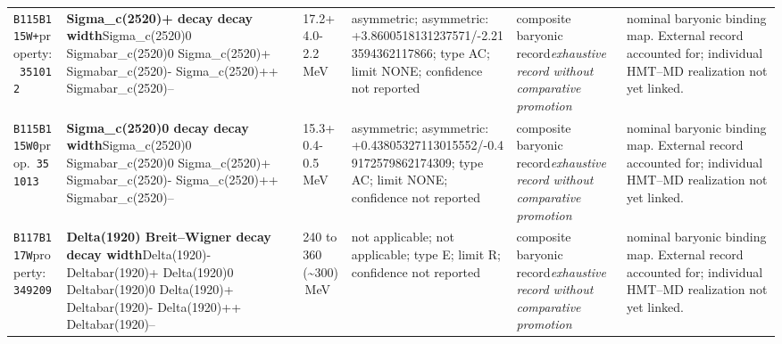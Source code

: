\begin{landscape}
\begin{longtable}{L{1.85cm}L{4.45cm}L{2.35cm}L{4.05cm}L{3.35cm}L{7.15cm}}
\texttt{B115}\newline \texttt{B115W+}\newline property:\ \texttt{351012} & \textbf{Sigma\_\allowbreak{}c(2520)+ decay decay width}\newline Sigma\_\allowbreak{}c(2520)0 \textbar{}\allowbreak{} Sigmabar\_\allowbreak{}c(2520)0 \textbar{}\allowbreak{} Sigma\_\allowbreak{}c(2520)+ \textbar{}\allowbreak{} Sigmabar\_\allowbreak{}c(2520)- \textbar{}\allowbreak{} Sigma\_\allowbreak{}c(2520)++ \textbar{}\allowbreak{} Sigmabar\_\allowbreak{}c(2520)-- & 17.2+4.0-2.2\,MeV & asymmetric; asymmetric: +3.8600518131237571/-2.213594362117866; type AC; limit NONE; confidence not reported & composite baryonic record\newline \emph{exhaustive record without comparative promotion} & nominal baryonic binding map. External record accounted for; individual HMT--MD realization not yet linked. \\
\texttt{B115}\newline \texttt{B115W0}\newline prop.\ \texttt{351013} & \textbf{Sigma\_\allowbreak{}c(2520)0 decay decay width}\newline Sigma\_\allowbreak{}c(2520)0 \textbar{}\allowbreak{} Sigmabar\_\allowbreak{}c(2520)0 \textbar{}\allowbreak{} Sigma\_\allowbreak{}c(2520)+ \textbar{}\allowbreak{} Sigmabar\_\allowbreak{}c(2520)- \textbar{}\allowbreak{} Sigma\_\allowbreak{}c(2520)++ \textbar{}\allowbreak{} Sigmabar\_\allowbreak{}c(2520)-- & 15.3+0.4-0.5\,MeV & asymmetric; asymmetric: +0.43805327113015552/-0.49172579862174309; type AC; limit NONE; confidence not reported & composite baryonic record\newline \emph{exhaustive record without comparative promotion} & nominal baryonic binding map. External record accounted for; individual HMT--MD realization not yet linked. \\
\texttt{B117}\newline \texttt{B117W}\newline property:\ \texttt{349209} & \textbf{Delta(1920) Breit--Wigner decay decay width}\newline Delta(1920)- \textbar{}\allowbreak{} Deltabar(1920)+ \textbar{}\allowbreak{} Delta(1920)0 \textbar{}\allowbreak{} Deltabar(1920)0 \textbar{}\allowbreak{} Delta(1920)+ \textbar{}\allowbreak{} Deltabar(1920)- \textbar{}\allowbreak{} Delta(1920)++ \textbar{}\allowbreak{} Deltabar(1920)-- & 240 to 360 (\textasciitilde{}300)\,MeV & not applicable; not applicable; type E; limit R; confidence not reported & composite baryonic record\newline \emph{exhaustive record without comparative promotion} & nominal baryonic binding map. External record accounted for; individual HMT--MD realization not yet linked. \\

\end{longtable}
\end{landscape}
